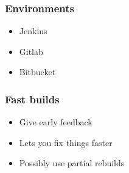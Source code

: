 \subsubsection{Environments}\label{ssub:environments}

\begin{itemize}
    \item Jenkins
    \item Gitlab
    \item Bitbucket
\end{itemize}

\subsubsection{Fast builds}\label{ssub:fast_builds}

\begin{itemize}
    \item Give early feedback
    \item Lets you fix things faster
    \item Possibly use partial rebuilds
\end{itemize}
